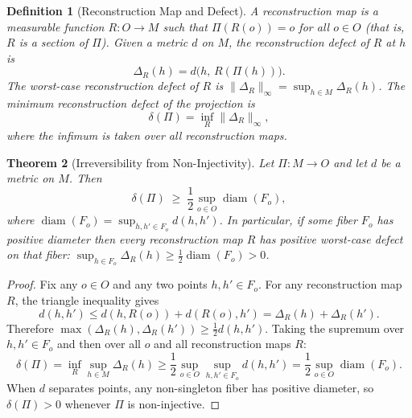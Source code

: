 \documentclass[12pt,a4paper]{article}
\newtheorem{theorem}{Theorem}[section]
\newtheorem{definition}[theorem]{Definition}
\theoremstyle{remark}
\theoremstyle{definition}
\begin{document}
\begin{definition}[Reconstruction Map and Defect]
\label{def:reconstruction}
A \emph{reconstruction map} is a measurable function
$R : O \to M$ such that $\Pi(R(o)) = o$ for all $o \in O$ (that is,
$R$ is a section of $\Pi$). Given a metric $d$ on $M$, the
\emph{reconstruction defect} of $R$ at $h$ is
\begin{equation}
  \Delta_R(h) = d\bigl(h,\, R(\Pi(h))\bigr).
\end{equation}
The \emph{worst-case reconstruction defect} of $R$ is
$\|\Delta_R\|_\infty = \sup_{h \in M} \Delta_R(h)$.
The \emph{minimum reconstruction defect} of the projection is
\begin{equation}
  \delta(\Pi) = \inf_R \|\Delta_R\|_\infty,
\end{equation}
where the infimum is taken over all reconstruction maps.
\end{definition}

\begin{theorem}[Irreversibility from Non-Injectivity]
\label{thm:irreversibility}
Let $\Pi : M \to O$ and let $d$ be a metric on $M$. Then
\begin{equation}
  \delta(\Pi)
  \;\geq\;
  \frac{1}{2}\sup_{o \in O}\operatorname{diam}(F_o),
  \label{eq:defect_diam}
\end{equation}
where $\operatorname{diam}(F_o) = \sup_{h,h' \in F_o} d(h,h')$. In
particular, if some fiber $F_o$ has positive diameter then every
reconstruction map $R$ has positive worst-case defect on that fiber:
$\sup_{h \in F_o} \Delta_R(h) \geq \frac{1}{2}\operatorname{diam}(F_o) > 0$.
\end{theorem}

\begin{proof}
Fix any $o \in O$ and any two points $h, h' \in F_o$. For any reconstruction
map $R$, the triangle inequality gives
\begin{equation*}
  d(h,h') \leq d(h, R(o)) + d(R(o), h')
  = \Delta_R(h) + \Delta_R(h').
\end{equation*}
Therefore $\max(\Delta_R(h), \Delta_R(h')) \geq \frac{1}{2}d(h,h')$.
Taking the supremum over $h, h' \in F_o$ and then over all $o$ and all
reconstruction maps $R$:
\begin{equation*}
  \delta(\Pi) = \inf_R \sup_{h \in M} \Delta_R(h)
  \geq \frac{1}{2}\sup_{o \in O}\sup_{h,h' \in F_o} d(h,h')
  = \frac{1}{2}\sup_{o \in O}\operatorname{diam}(F_o).
\end{equation*}
When $d$ separates points, any non-singleton fiber has positive diameter,
so $\delta(\Pi) > 0$ whenever $\Pi$ is non-injective.
\end{proof}
\end{document}
